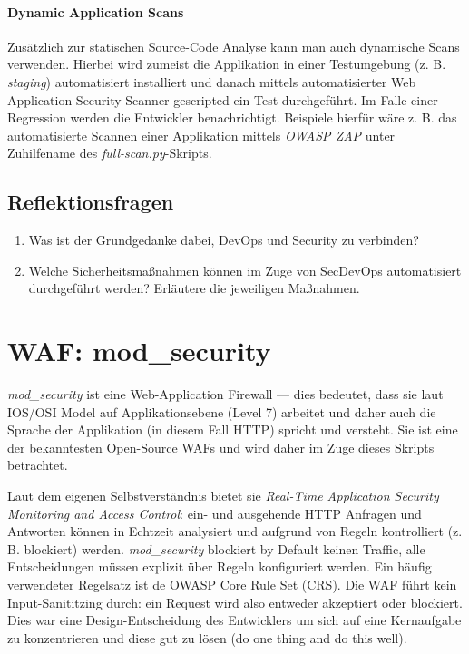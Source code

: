 \subsubsection{Dynamic Application Scans}

Zusätzlich zur statischen Source-Code Analyse kann man auch dynamische Scans verwenden. Hierbei wird zumeist die Applikation in einer Testumgebung (z. B. \textit{staging}) automatisiert installiert und danach mittels automatisierter Web Application Security Scanner gescripted ein Test durchgeführt. Im Falle einer Regression werden die Entwickler benachrichtigt. Beispiele hierfür wäre z. B. das automatisierte Scannen einer Applikation mittels \textit{OWASP ZAP} unter Zuhilfename des \textit{full-scan.py}-Skripts.

\section{Reflektionsfragen}

\begin{enumerate}
	\item Was ist der Grundgedanke dabei, DevOps und Security zu verbinden?
	\item Welche Sicherheitsmaßnahmen können im Zuge von SecDevOps automatisiert durchgeführt werden? Erläutere die jeweiligen Maßnahmen.
\end{enumerate}

\chapter{WAF: mod\_security}

\textit{mod\_security} ist eine Web-Application Firewall --- dies bedeutet, dass sie laut IOS/OSI Model auf Applikationsebene (Level 7) arbeitet und daher auch die Sprache der Applikation (in diesem Fall HTTP) spricht und versteht. Sie ist eine der bekanntesten Open-Source WAFs und wird daher im Zuge dieses Skripts betrachtet.

Laut dem eigenen Selbstverständnis bietet sie \textit{Real-Time Application Security Monitoring and Access Control}: ein- und ausgehende HTTP Anfragen und Antworten können in Echtzeit analysiert und aufgrund von Regeln kontrolliert (z. B. blockiert) werden. \textit{mod\_security} blockiert by Default keinen Traffic, alle Entscheidungen müssen explizit über Regeln konfiguriert werden. Ein häufig verwendeter Regelsatz ist de OWASP Core Rule Set (CRS). Die WAF führt kein Input-Sanititzing durch: ein Request wird also entweder akzeptiert oder blockiert. Dies war eine Design-Entscheidung des Entwicklers um sich auf eine Kernaufgabe zu konzentrieren und diese gut zu lösen (do one thing and do this well).

